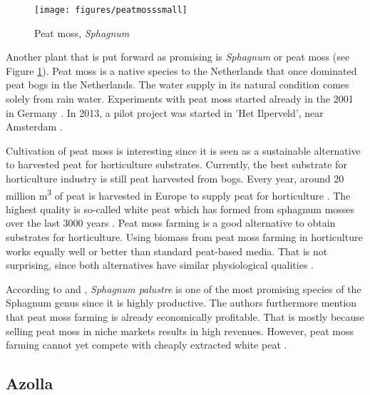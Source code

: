\documentclass[a4paper,12pt]{scrbook}
\begin{document}
\begin{figure}
    \centering
    \texttt{[image: figures/peatmosssmall]} 
    \caption{Peat moss, \textit{Sphagnum}}
    \label{fig:peatmoss}
\end{figure}

Another plant that is put forward as promising is \textit{Sphagnum} or peat moss (see Figure \ref{fig:peatmoss}). Peat moss is a native species to the Netherlands that once dominated peat bogs in the Netherlands. The water supply in its natural condition comes solely from rain water. Experiments with peat moss started already in the 2001 in Germany \citep{gaudig2014sphagnum}. In 2013, a pilot project was started in 'Het Ilperveld', near Amsterdam \citep{van2013werk}. 


Cultivation of peat moss is interesting since it is seen as a sustainable alternative to harvested peat for horticulture substrates. Currently, the best substrate for horticulture industry is still peat harvested from bogs. Every year, around 20 million m\textsuperscript{3} of peat is harvested in Europe to supply peat for horticulture \citep{altmann2008socio}. The highest quality is so-called white peat which has formed from sphagnum mosses over the last 3000 years \citep{gaudig2014sphagnum}. Peat moss farming is a good alternative to obtain substrates for horticulture. Using biomass from peat moss farming in horticulture works equally well or better than standard peat-based media. That is not surprising, since both alternatives have similar physiological qualities \citep{gaudig2014sphagnum}. 

According to \citet{gaudig2014sphagnum} and \citet{wichtmann2016paludiculture}, \textit{Sphagnum palustre} is one of the most promising species of the Sphagnum genus since it is highly productive. The authors furthermore mention that peat moss farming is already economically profitable. That is mostly because selling peat moss in niche markets results in high revenues. However, peat moss farming cannot yet compete with cheaply extracted white peat \citep{gaudig2014sphagnum}.


\subsection{Azolla}
\end{document}
